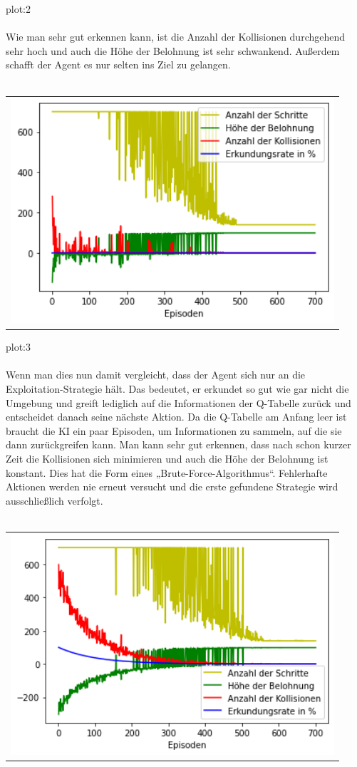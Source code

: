 \documentclass[12pt,titlepage]{article}
\begin{document}
plot:2\\\\
Wie man sehr gut erkennen kann, ist die Anzahl der Kollisionen durchgehend sehr hoch und auch die Höhe der Belohnung ist sehr schwankend. Außerdem schafft der Agent es nur selten ins Ziel zu gelangen.
\\\\
\begin{tabular}{c}
\includegraphics[width=12cm]{QL_Laby_2.png}
\end{tabular}

plot:3\\\\
Wenn man dies nun damit vergleicht, dass der Agent sich nur an die Exploitation-Strategie hält. Das bedeutet, er erkundet so gut wie gar nicht die Umgebung und greift lediglich auf die Informationen der Q-Tabelle zurück und entscheidet danach seine nächste Aktion. Da die Q-Tabelle am Anfang leer ist braucht die KI ein paar Episoden, um Informationen zu sammeln, auf die sie dann zurückgreifen kann. Man kann sehr gut erkennen, dass nach schon kurzer Zeit die Kollisionen sich minimieren und auch die Höhe der Belohnung ist konstant. Dies hat die Form eines „Brute-Force-Algorithmus“. Fehlerhafte Aktionen werden nie erneut versucht und die erste gefundene Strategie wird ausschließlich verfolgt.
\\\\
\begin{tabular}{c}
\includegraphics[width=12cm]{QL_Laby_3.png}
\end{tabular}
\end{document}
